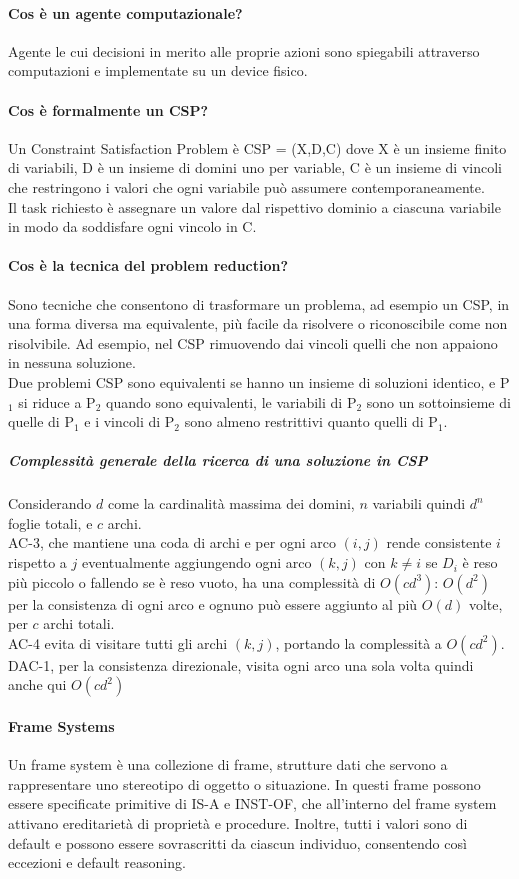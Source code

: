 \documentclass[10pt]{report}
\begin{document}
\paragraph{Cos è un agente computazionale?} Agente le cui decisioni in merito alle proprie azioni sono spiegabili attraverso computazioni e implementate su un device fisico.
\paragraph{Cos è formalmente un CSP?} Un Constraint Satisfaction Problem è CSP = (X,D,C) dove X è un insieme finito di variabili, D è un insieme di domini uno per variable, C è un insieme di vincoli che restringono i valori che ogni variabile può assumere contemporaneamente.\\
Il task richiesto è assegnare un valore dal rispettivo dominio a ciascuna variabile in modo da soddisfare ogni vincolo in C.
\paragraph{Cos è la tecnica del problem reduction?} Sono tecniche che consentono di trasformare un problema, ad esempio un CSP, in una forma diversa ma equivalente, più facile da risolvere o riconoscibile come non risolvibile. Ad esempio, nel CSP rimuovendo dai vincoli quelli che non appaiono in nessuna soluzione.\\
Due problemi CSP sono equivalenti se hanno un insieme di soluzioni identico, e P$_1$ si riduce a P$_2$ quando sono equivalenti, le variabili di P$_2$ sono un sottoinsieme di quelle di P$_1$ e i vincoli di P$_2$ sono almeno restrittivi quanto quelli di P$_1$.
\subparagraph{Complessità generale della ricerca di una soluzione in CSP} Considerando $d$ come la cardinalità massima dei domini, $n$ variabili quindi $d^n$ foglie totali, e $c$ archi.\\
AC-3, che mantiene una coda di archi e per ogni arco $(i,j)$ rende consistente $i$ rispetto a $j$ eventualmente aggiungendo ogni arco $(k,j)$ con $k\neq i$ se $D_i$ è reso più piccolo o fallendo se è reso vuoto, ha una complessità di $O(cd^3)$: $O(d^2)$ per la consistenza di ogni arco e ognuno può essere aggiunto al più $O(d)$ volte, per $c$ archi totali.\\
AC-4 evita di visitare tutti gli archi $(k,j)$, portando la complessità a $O(cd^2)$.
DAC-1, per la consistenza direzionale, visita ogni arco una sola volta quindi anche qui $O(cd^2)$
\paragraph{Frame Systems} Un frame system è una collezione di frame, strutture dati che servono a rappresentare uno stereotipo di oggetto o situazione. In questi frame possono essere specificate primitive di IS-A e INST-OF, che all'interno del frame system attivano ereditarietà di proprietà e procedure. Inoltre, tutti i valori sono di default e possono essere sovrascritti da ciascun individuo, consentendo così eccezioni e default reasoning.
\end{document}
